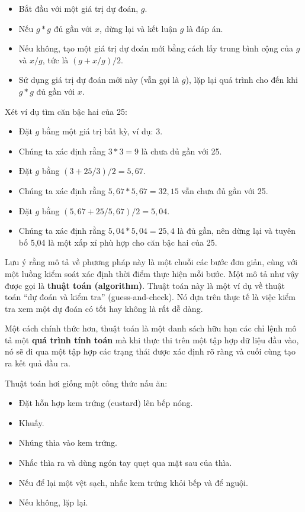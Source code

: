 \begin{itemize}
    \item Bắt đầu với một giá trị dự đoán, $g$.
    \item Nếu $g * g$ đủ gần với $x$, dừng lại và kết luận $g$ là đáp án.
    \item Nếu không, tạo một giá trị dự đoán mới bằng cách lấy trung bình cộng của $g$ và $x/g$, tức là $(g + x/g) / 2$.
    \item Sử dụng giá trị dự đoán mới này (vẫn gọi là $g$), lặp lại quá trình cho đến khi $g * g$ đủ gần với $x$.
\end{itemize}

Xét ví dụ tìm căn bậc hai của 25:

\begin{itemize}
    \item Đặt $g$ bằng một giá trị bất kỳ, ví dụ: 3.
    \item Chúng ta xác định rằng $3 * 3 = 9$ là chưa đủ gần với 25.
    \item Đặt $g$ bằng $(3 + 25/3) / 2 = 5,67$.
    \item Chúng ta xác định rằng $5,67 * 5,67 = 32,15$ vẫn chưa đủ gần với 25.
    \item Đặt $g$ bằng $(5,67 + 25/5,67) / 2 = 5,04$.
    \item Chúng ta xác định rằng $5,04 * 5,04 = 25,4$ là đủ gần, nên dừng lại và tuyên bố 5,04 là một xấp xỉ phù hợp cho căn bậc hai của 25.
\end{itemize}

Lưu ý rằng mô tả về phương pháp này là một chuỗi các bước đơn giản, cùng với một luồng kiểm soát xác định thời điểm thực hiện mỗi bước. Một mô tả như vậy được gọi là \textbf{thuật toán (algorithm)}. Thuật toán này là một ví dụ về thuật toán ``dự đoán và kiểm tra'' (guess-and-check). Nó dựa trên thực tế là việc kiểm tra xem một dự đoán có tốt hay không là rất dễ dàng.

Một cách chính thức hơn, thuật toán là một danh sách hữu hạn các chỉ lệnh mô tả một \textbf{quá trình tính toán} mà khi thực thi trên một tập hợp dữ liệu đầu vào, nó sẽ đi qua một tập hợp các trạng thái được xác định rõ ràng và cuối cùng tạo ra kết quả đầu ra.

Thuật toán hơi giống một công thức nấu ăn:

\begin{itemize}
    \item Đặt hỗn hợp kem trứng (custard) lên bếp nóng.
    \item Khuấy.
    \item Nhúng thìa vào kem trứng.
    \item Nhấc thìa ra và dùng ngón tay quẹt qua mặt sau của thìa.
    \item Nếu để lại một vệt sạch, nhấc kem trứng khỏi bếp và để nguội.
    \item Nếu không, lặp lại.
\end{itemize}

